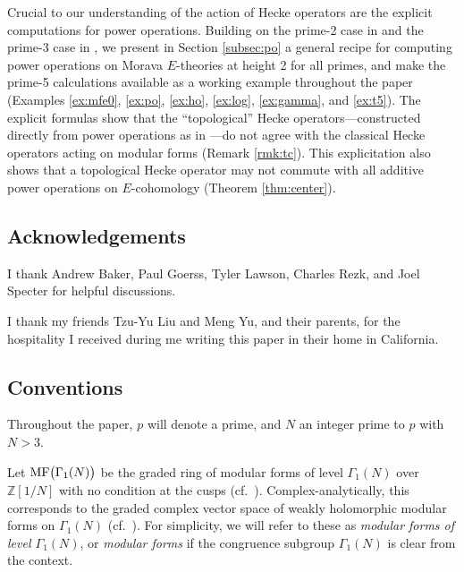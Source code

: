 \documentclass{gtpart}
\theoremstyle{definition}
\theoremstyle{remark}
\newcommand{\mb}[1]{\mathbb{#1}}
\newcommand{\BZ}{{\mb Z}}
\newcommand{\MF}{{\rm MF}}
\newcommand{\G}{\Gamma}
\renewcommand{\=}{\approx}
\renewcommand{\-}{\sim}
\numberwithin{equation}{section}
\begin{document}
Crucial to our understanding of the action of Hecke operators are the explicit 
computations for power operations.  Building on the prime-2 case in \cite{h2p2} 
and the prime-3 case in \cite{p3}, we present in Section \ref{subsec:po} a 
general recipe for computing power operations on Morava $E$-theories at height 2 
for all primes, and make the prime-5 calculations available as a working example 
throughout the paper (Examples \ref{ex:mfe0}, \ref{ex:po}, \ref{ex:ho}, 
\ref{ex:log}, \ref{ex:gamma}, and \ref{ex:t5}).  The explicit formulas show that 
the ``topological'' Hecke operators---constructed directly from power operations 
as in \cite[Proposition 3.6.2]{Ando95}---do not agree with the classical Hecke 
operators acting on modular forms (Remark \ref{rmk:tc}).  This explicitation 
also shows that a topological Hecke operator may not commute with all additive 
power operations on $E$-cohomology (Theorem \ref{thm:center}).  
\vspace{-.07in}



\subsection{Acknowledgements}

I thank Andrew Baker, Paul Goerss, Tyler Lawson, Charles Rezk, and Joel Specter 
for helpful discussions.  

I thank my friends Tzu-Yu Liu and Meng Yu, and their parents, for the 
hospitality I received during me writing this paper in their home in California.  



\subsection{Conventions}

Throughout the paper, $p$ will denote a prime, and $N$ an integer prime to $p$ 
with $N > 3$.  

Let $\MF\big(\G_1(N)\big)$ be the graded ring of modular forms of level 
$\G_1(N)$ over $\BZ[1/N]$ with no condition at the cusps 
(cf.~\cite[Section 1.2]{padicprop}).  Complex-analytically, this corresponds to 
the graded complex vector space of weakly holomorphic modular forms on $\G_1(N)$ 
(cf.~\cite[Definition 1.12]{web}).  For simplicity, we will refer to these as 
{\em modular forms of level $\G_1(N)$}, or {\em modular forms} if the congruence 
subgroup $\G_1(N)$ is clear from the context.  
\end{document}
